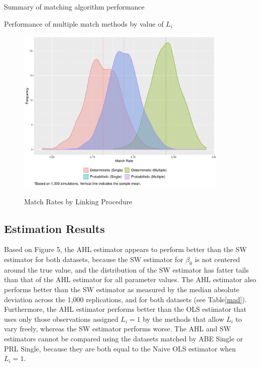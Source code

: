 \documentclass[12pt]{article}
\begin{document}

\begin{table}[htbp]
\let\center\empty
\let\endcenter\relax
\centering
\caption{Summary of matching algorithm performance}
\vspace{10pt}
\resizebox{\textwidth}{!}{}
\label{match_rate}
\end{table}

\begin{table}[htbp]
\let\center\empty
\let\endcenter\relax
\centering
\caption{Performance of multiple match methods by value of $L_i$}
\vspace{10pt}
\resizebox{\textwidth}{!}{}
\label{multi_L}
\end{table}

\begin{figure}[h!]
\begin{center}
\caption{Match Rates by Linking Procedure } 
\includegraphics[width=0.9\textwidth]{./Figures/match_rate.pdf}
\label{match_hist}
\end{center}
\end{figure}

\subsection{Estimation Results}

Based on Figure 5, the AHL estimator appears to perform better than the SW estimator for both datasets, because the SW estimator for $\beta_0$ is not centered around the true value, and the distribution of the SW estimator has fatter tails than that of the AHL estimator for all parameter values.  The AHL estimator also performs better than the SW estimator as measured by the median absolute deviation across the 1,000 replications, and for both datasets (see Table\ref{mad}).   Furthermore, the AHL estimator performs better than the OLS estimator that uses only those observations assigned $L_i =1$ by the methods that allow $L_i$ to vary freely, whereas the SW estimator performs worse.  The AHL and SW estimators cannot be compared using the datasets matched by ABE Single or PRL Single, because they are both equal to the Naive OLS estimator when $L_i = 1$.  
\end{document}
